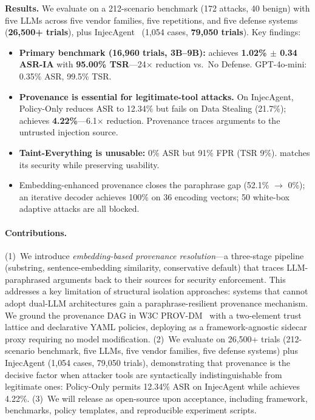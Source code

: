 \textbf{Results.}
We evaluate \sys{} on a 212-scenario benchmark (172 attacks, 40 benign) with five LLMs across five vendor families, five repetitions, and five defense systems (\textbf{26{,}500+ trials}), plus InjecAgent~\cite{injecagent2024} (1{,}054 cases, \textbf{79{,}050 trials}). Key findings:
\begin{itemize}[leftmargin=1.2em]
  \item \textbf{Primary benchmark (16{,}960 trials, 3B--9B):} \sys{} achieves \textbf{1.02\% $\pm$ 0.34 ASR-IA} with \textbf{95.00\% TSR}---24$\times$ reduction vs.\ No Defense. GPT-4o-mini: 0.35\% ASR, 99.5\% TSR.
  \item \textbf{Provenance is essential for legitimate-tool attacks.} On InjecAgent, Policy-Only reduces ASR to 12.34\% but fails on Data Stealing (21.7\%); \sys{} achieves \textbf{4.22\%}---6.1$\times$ reduction. Provenance traces arguments to the untrusted injection source.
  \item \textbf{Taint-Everything is unusable:} 0\% ASR but 91\% FPR (TSR 9\%). \sys{} matches its security while preserving usability.
  \item Embedding-enhanced provenance closes the paraphrase gap (52.1\% $\to$ 0\%); an iterative decoder achieves 100\% on 36 encoding vectors; 50 white-box adaptive attacks are all blocked.
\end{itemize}

\paragraph{Contributions.}
(1)~We introduce \emph{embedding-based provenance resolution}---a three-stage pipeline (substring, sentence-embedding similarity, conservative default) that traces LLM-paraphrased arguments back to their sources for security enforcement. This addresses a key limitation of structural isolation approaches: systems that cannot adopt dual-LLM architectures gain a paraphrase-resilient provenance mechanism. We ground the provenance DAG in W3C PROV-DM~\cite{prov-dm} with a two-element trust lattice and declarative YAML policies, deploying as a framework-agnostic sidecar proxy requiring no model modification.
(2)~We evaluate on 26{,}500+ trials (212-scenario benchmark, five LLMs, five vendor families, five defense systems) plus InjecAgent (1{,}054 cases, 79{,}050 trials), demonstrating that provenance is the decisive factor when attacker tools are syntactically indistinguishable from legitimate ones: Policy-Only permits 12.34\% ASR on InjecAgent while \sys{} achieves 4.22\%.
(3)~We will release \sys{} as open-source upon acceptance, including framework, benchmarks, policy templates, and reproducible experiment scripts.
